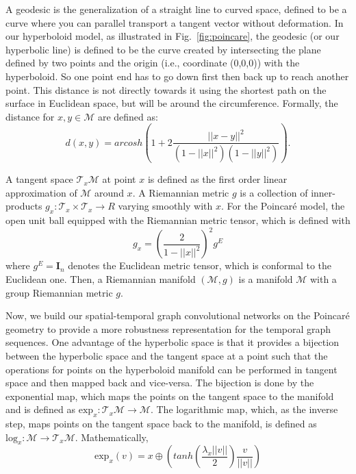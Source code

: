 \documentclass[letterpaper]{article} \usepackage{aaai19}  \usepackage{times}  \usepackage{helvet} \usepackage{courier}  \usepackage[hyphens]{url}  \usepackage{graphicx} \urlstyle{rm} \def\UrlFont{\rm}  \usepackage{graphicx}  \frenchspacing  \setlength{\pdfpagewidth}{8.5in}  \setlength{\pdfpageheight}{11in}
\begin{document}
A geodesic is the generalization of a straight line to curved space, defined to be a curve where you can parallel transport a tangent vector without deformation. In our hyperboloid model, as illustrated in Fig.~\ref{fig:poincare}, the geodesic (or our hyperbolic line) is defined to be the curve created by intersecting the plane defined by two points and the origin (i.e., coordinate (0,0,0)) with the hyperboloid. So one point end has to go down first then back up to reach another point. This distance is not directly towards it using the shortest path on the surface in Euclidean space, but will be around the circumference. Formally, the distance for $x,y \in \mathcal{M}$ are defined as:
\begin{equation}
    d(x,y) = arcosh(1+2\frac{||x-y||^2}{(1-||x||^2)(1-||y||^2)}).
\end{equation}

A tangent space $\mathcal{T}_{x}\mathcal{M}$ at point $x$ is defined as the first order linear approximation of $\mathcal{M}$ around $x$.
A Riemannian metric $g$ is a collection of inner-products $g_x: \mathcal{T}_{x}\times \mathcal{T}_{x}\rightarrow \mathit{R}$ varying smoothly with $x$. For the Poincar\'e model, the open unit ball equipped with the Riemannian metric tensor, which is defined with
\begin{equation}
    g_x = (\frac{2}{1-||x||^{2}})^{2}g^{\mathit{E}}
\end{equation}
where $g^{E} = \mathbf{I}_n$ denotes the Euclidean metric tensor, which is conformal to the Euclidean one. Then, a Riemannian manifold $(\mathcal{M},g)$ is a manifold $\mathcal{M}$ with a group Riemannian metric $g$. 

Now, we build our spatial-temporal graph convolutional networks on the Poincar\'e geometry to provide a more robustness representation for the temporal graph sequences. One advantage of the hyperbolic space is that it provides a bijection between the hyperbolic space and the tangent space at a point such that the operations for points on the hyperboloid manifold can be performed in tangent space and then mapped back and vice-versa. The bijection is done by the exponential map, which maps the points on the tangent space to the manifold and is defined as $\text{exp}_x: \mathcal{T}_{x}\mathcal{M}\rightarrow \mathcal{M}$. The logarithmic map, which, as the inverse step, maps points on the tangent space back to the manifold, is defined as $\text{log}_x: \mathcal{M} \rightarrow  \mathcal{T}_{x}\mathcal{M}$. Mathematically,
\begin{equation}
    \text{exp}_x(v) = x \oplus (tanh(\frac{\lambda_x||v||}{2})\frac{v}{||v||})
\end{equation}
    
\end{document}
